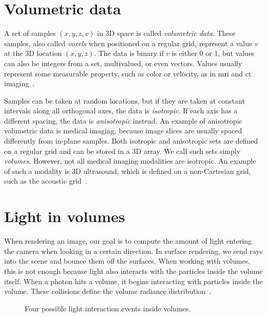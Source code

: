 \section{Volumetric data}

A set of samples $(x, y, z, v)$ in 3D space is called \emph{volumetric data}.
These samples, also called \emph{voxels} when positioned on a regular grid,
represent a value $v$ at the 3D location $(x, y, z)$. The data is binary if
$v$ is either $0$ or $1$, but values can also be integers from a set,
multivalued, or even vectors. Values usually represent some measurable property,
such as color or velocity, as in \ac{mri} and \ac{ct}
imaging~\cite{kaufman_7_2005, kaufman_43_2000}.

Samples can be taken at random locations, but if they are taken at constant 
intervals along all orthogonal axes, the data is \emph{isotropic}. If each
axis has a different spacing, the data is \emph{anisotropic} instead. An example
of anisotropic volumetric data is medical imaging, because image slices are
usually spaced differently from in-plane samples. Both isotropic and
anisotropic sets are defined on a regular grid and can be stored in a 3D array.
We call such sets simply \emph{volumes}. However, not all medical imaging
modalities are isotropic. An example of such a modality is 3D ultrasound,
which is defined on a non-Cartesian grid, such as the acoustic
grid~\cite{fernando_chapter_2004}.

\section{Light in volumes}

When rendering an image, our goal is to compute the amount of light entering
the camera when looking in a certain direction. In surface rendering, we send
rays into the scene and bounce them off the surfaces. When working with volumes,
this is not enough because light also interacts with the particles inside
the volume itself. When a photon hits a volume, it begins interacting with
particles inside the volume. These collisions define the volume radiance
distribution~\cite{fong_production_2017, wrenninge_production_2012}.

\begin{figure}[b]
    \centering
    
    \caption{Four possible light interaction events inside volumes.}
    \label{fig:rte}
\end{figure}

